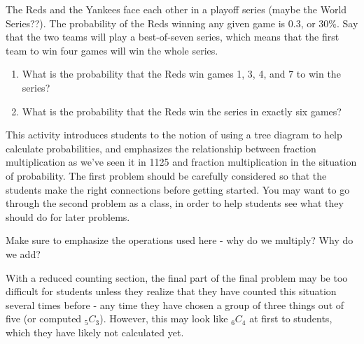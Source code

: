 \documentclass[nooutcomes,noauthor,handout]{ximera}
\begin{document}
\begin{problem}
The Reds and the Yankees face each other in a playoff series (maybe the World Series??).  The probability of the Reds winning any given game is 0.3, or 30\%.  Say that the two teams will play a best-of-seven series, which means that the first team to win four games will win the whole series.

\begin{enumerate}
\item What is the probability that the Reds win games 1, 3, 4, and 7 to win the series?
\item What is the probability that the Reds win the series in exactly six games?
\end{enumerate}
\end{problem}


\newpage

\begin{instructorNotes}
This activity introduces students to the notion of using a tree diagram to help calculate probabilities, and emphasizes the relationship between fraction multiplication as we've seen it in 1125 and fraction multiplication in the situation of probability.  The first problem should be carefully considered so that the students make the right connections before getting started.  You may want to go through the second problem as a class, in order to help students see what they should do for later problems.

Make sure to emphasize the operations used here - why do we multiply?  Why do we add?

With a reduced counting section, the final part of the final problem may be too difficult for students unless they realize that they have counted this situation several times before - any time they have chosen a group of three things out of five (or computed $_5C_3$).  However, this may look like $_6C_4$ at first to students, which they have likely not calculated yet.
\end{instructorNotes}
\end{document}
